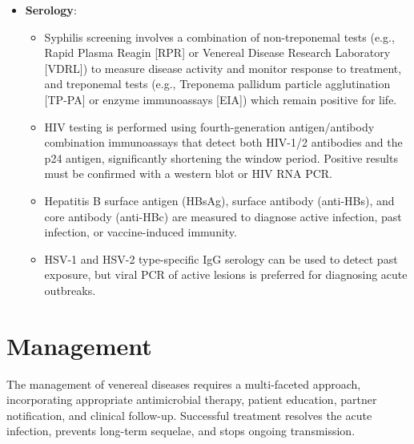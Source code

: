 \begin{itemize}
\begin{itemize}
\begin{itemize}
            \item Darkfield microscopy can directly visualize the motile spirochete \textit{Treponema pallidum} from primary or secondary lesion exudates, though it requires specialized equipment and expertise.
        \end{itemize}
        \item \textbf{Serology}:
        \begin{itemize}
            \item Syphilis screening involves a combination of non-treponemal tests (e.g., Rapid Plasma Reagin [RPR] or Venereal Disease Research Laboratory [VDRL]) to measure disease activity and monitor response to treatment, and treponemal tests (e.g., Treponema pallidum particle agglutination [TP-PA] or enzyme immunoassays [EIA]) which remain positive for life.
            \item HIV testing is performed using fourth-generation antigen/antibody combination immunoassays that detect both HIV-1/2 antibodies and the p24 antigen, significantly shortening the window period. Positive results must be confirmed with a western blot or HIV RNA PCR.
            \item Hepatitis B surface antigen (HBsAg), surface antibody (anti-HBs), and core antibody (anti-HBc) are measured to diagnose active infection, past infection, or vaccine-induced immunity.
            \item HSV-1 and HSV-2 type-specific IgG serology can be used to detect past exposure, but viral PCR of active lesions is preferred for diagnosing acute outbreaks.
        \end{itemize}
    \end{itemize}
\end{itemize}

\section*{Management}
The management of venereal diseases requires a multi-faceted approach, incorporating appropriate antimicrobial therapy, patient education, partner notification, and clinical follow-up. Successful treatment resolves the acute infection, prevents long-term sequelae, and stops ongoing transmission.

